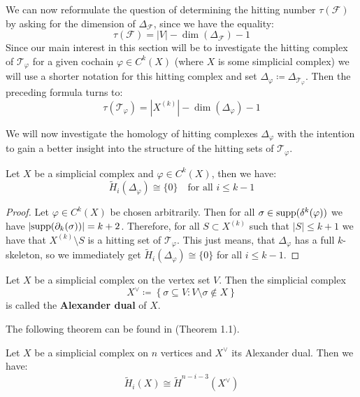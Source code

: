 We can now reformulate the question of determining the hitting number \(\tau(\mathcal{F})\) by asking for the dimension of \(\Delta_{\mathcal{F}}\), since we have the equality:
\[
\tau(\mathcal{F})=\left| V\right|-\dim(\Delta_{\mathcal{F}})-1
\]
Since our main interest in this section will be to investigate the hitting complex of \(\mathcal{T}_{\varphi}\) for a given cochain \(\varphi\in C^k(X)\) (where \(X\) is some simplicial complex) we will use a shorter notation for this hitting complex and set \(\Delta_{\varphi}\coloneqq \Delta_{\mathcal{T}_{\varphi}}\). Then the preceding formula turns to:
\[
\tau(\mathcal{T}_{\varphi})=|X^{(k)}|-\dim(\Delta_{\varphi})-1
\]

We will now investigate the homology of hitting complexes \(\Delta_{\varphi}\) with the intention to gain a better insight into the structure of the hitting sets of \(\mathcal{T}_{\varphi}\).

\begin{thm}
Let \(X\) be a simplicial complex and \(\varphi\in C^k(X)\), then we have:
\[
\tilde{H}_i(\Delta_{\varphi})\cong\{0\}\quad\text{for all }i\leq k-1
\]
\begin{proof}
Let \(\varphi\in C^k(X)\) be chosen arbitrarily. Then for all \(\sigma\in \mathrm{supp}(\delta^k(\varphi))\) we have \(\left|\mathrm{supp}(\partial_k(\sigma))\right|=k+2\). Therefore, for all \(S\subset X^{(k)}\) such that \(\left|S\right|\leq k+1\) we have that \(X^{(k)}\setminus S\) is a hitting set of \(\mathcal{T}_{\varphi}\). This just means, that \(\Delta_{\varphi}\) has a full \(k\)-skeleton, so we immediately get \(\tilde{H}_i(\Delta_{\varphi})\cong\{0\}\) for all \(i\leq k-1\).
\end{proof}
\end{thm}

\begin{defi}
Let \(X\) be a simplicial complex on the vertex set \(V\). Then the simplicial complex
\[
X^{\lor}\coloneqq \left\{\sigma\subseteq V:V\setminus\sigma\notin X\right\}
\]
is called the \textbf{Alexander dual} of \(X\).
\end{defi}

The following theorem can be found in \cite{8} (Theorem 1.1).

\begin{thm}\label{theorem12}
Let \(X\) be a simplicial complex on \(n\) vertices and \(X^{\lor}\) its Alexander dual. Then we have:
\[
\tilde{H}_i(X)\cong\tilde{H}^{n-i-3}(X^{\lor})
\]
\end{thm}

